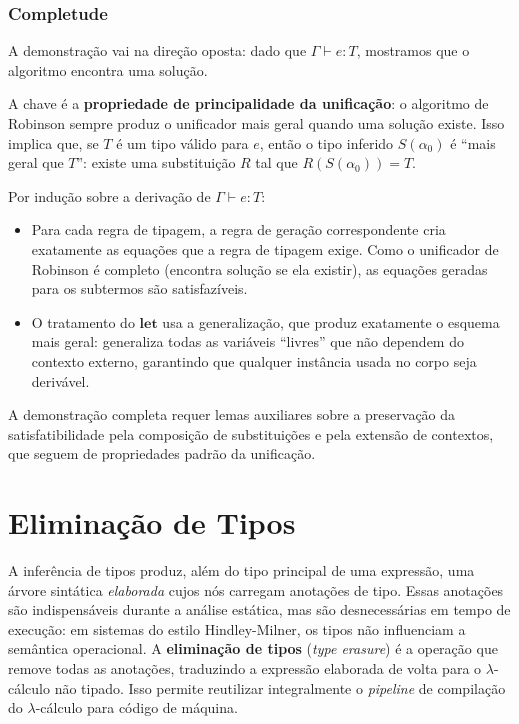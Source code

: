   \subsubsection{Completude}

  A demonstração vai na direção oposta: dado que \(\Gamma \vdash e :
  T\), mostramos que o algoritmo encontra uma solução.

  A chave é a \textbf{propriedade de principalidade da unificação}: o
  algoritmo de Robinson sempre produz o unificador mais geral quando
  uma solução existe. Isso implica que, se \(T\) é um tipo válido para
  \(e\), então o tipo inferido \(S(\alpha_0)\) é ``mais geral que
  \(T\)'': existe uma substituição \(R\) tal que \(R(S(\alpha_0)) = T\).

  Por indução sobre a derivação de \(\Gamma \vdash e : T\):

  \begin{itemize}
    \item
      Para cada regra de tipagem, a regra de geração correspondente
      cria exatamente as equações que a regra de tipagem exige. Como o
      unificador de Robinson é completo (encontra solução se ela
      existir), as equações geradas para os subtermos são satisfazíveis.
    \item
      O tratamento do \(\mathbf{let}\) usa a generalização, que produz
      exatamente o esquema mais geral: generaliza todas as variáveis
      ``livres'' que não dependem do contexto externo, garantindo que
      qualquer instância usada no corpo seja derivável.
  \end{itemize}

  A demonstração completa requer lemas auxiliares sobre a preservação
  da satisfatibilidade pela composição de substituições e pela extensão
  de contextos, que seguem de propriedades padrão da unificação.

  \section{Eliminação de Tipos}

  A inferência de tipos produz, além do tipo principal de uma expressão,
  uma árvore sintática \emph{elaborada} cujos nós carregam anotações de
  tipo. Essas anotações são indispensáveis durante a análise estática, mas
  são desnecessárias em tempo de execução: em sistemas do estilo
  Hindley-Milner, os tipos não influenciam a semântica operacional. A
  \textbf{eliminação de tipos} (\emph{type erasure}) é a operação que
  remove todas as anotações, traduzindo a expressão elaborada de volta para
  o $\lambda$-cálculo não tipado. Isso permite reutilizar integralmente o
  \emph{pipeline} de compilação do $\lambda$-cálculo para código de máquina.


